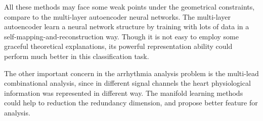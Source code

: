 \documentclass[journal]{IEEEtran}
\begin{document}
All these methods may face some weak points under the geometrical constraints, compare to the multi-layer autoencoder neural networks.
The multi-layer autoencoder learn a neural network structure by training with lots of data in a self-mapping-and-reconstruction way.
Though it is not easy to employ some graceful theoretical explanations, its powerful representation ability could perform much better in this classification task.

The other important concern in the arrhythmia analysis problem is the multi-lead combinational analysis, since in different signal channels the heart physiological information was represented in different way. The manifold learning methods could help to reduction the redundancy dimension, and propose better feature for analysis.


%
%




%
%
\end{document}

